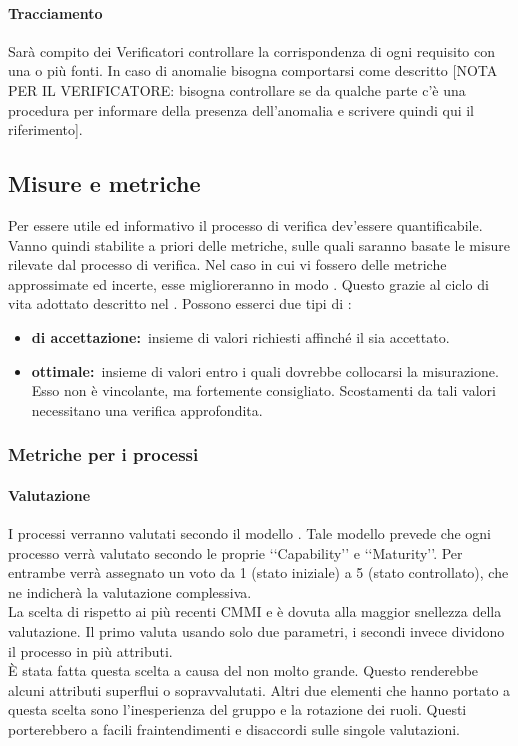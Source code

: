 			\paragraph{Tracciamento}
				Sarà compito dei Verificatori controllare la corrispondenza di ogni requisito con una o più fonti. In caso di anomalie bisogna comportarsi come descritto [NOTA PER IL VERIFICATORE: bisogna controllare se da qualche parte c'è una procedura per informare della presenza dell'anomalia e scrivere quindi qui il riferimento].
	\subsection{Misure e metriche}
		\label{sec:3.9}
		Per essere utile ed informativo il processo di verifica dev'essere quantificabile. Vanno quindi stabilite a priori delle metriche, sulle quali saranno basate le misure rilevate dal processo di verifica. Nel caso in cui vi fossero delle metriche approssimate ed incerte, esse miglioreranno in modo . Questo grazie al ciclo di vita adottato descritto nel \PPdoc. Possono esserci due tipi di :
		\begin{itemize}
			\item \textbf{ di accettazione:}\ insieme di valori richiesti affinché il  sia accettato.
			\item \textbf{ ottimale:}\ insieme di valori entro i quali dovrebbe collocarsi la misurazione. Esso non è vincolante, ma fortemente consigliato. Scostamenti da tali valori necessitano una verifica approfondita.
		\end{itemize}
		\subsubsection{Metriche per i processi}
			\label{sec:3.9.1}
			\paragraph{Valutazione }
				\label{sec:3.9.1.1}
				I processi verranno valutati secondo il modello . Tale modello prevede che ogni processo verrà valutato secondo le proprie ‘‘Capability’’ e ‘‘Maturity’’. Per entrambe verrà assegnato un voto da 1 (stato iniziale) a 5 (stato controllato), che ne indicherà la valutazione complessiva. \\
				La scelta di  rispetto ai più recenti CMMI e  è dovuta alla maggior snellezza della valutazione. Il primo valuta usando solo due parametri, i secondi invece dividono il processo in più attributi. \\
				È stata fatta questa scelta a causa del  non molto grande. Questo renderebbe alcuni attributi superflui o sopravvalutati. Altri due elementi che hanno portato a questa scelta sono l'inesperienza del gruppo e la rotazione dei ruoli. Questi porterebbero a facili fraintendimenti e disaccordi sulle singole valutazioni.
				
